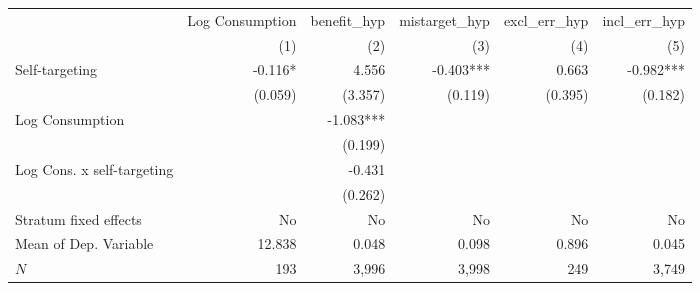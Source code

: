 \begin{tabular}{lrrrrr}
\toprule
                           & \multicolumn{1}{c}{Log Consumption} & \multicolumn{1}{c}{benefit_hyp} & \multicolumn{1}{c}{mistarget_hyp} & \multicolumn{1}{c}{excl_err_hyp} & \multicolumn{1}{c}{incl_err_hyp} \\ 
\cmidrule(lr){2-2} \cmidrule(lr){3-3} \cmidrule(lr){4-4} \cmidrule(lr){5-5} \cmidrule(lr){6-6} 
                           &                                 (1) &                             (2) &                               (3) &                              (4) &                              (5) \\ 
\midrule
Self-targeting             &                             -0.116* &                           4.556 &                         -0.403*** &                            0.663 &                        -0.982*** \\ 
                           &                             (0.059) &                         (3.357) &                           (0.119) &                          (0.395) &                          (0.182) \\ 
Log Consumption            &                                     &                       -1.083*** &                                   &                                  &                                  \\ 
                           &                                     &                         (0.199) &                                   &                                  &                                  \\ 
Log Cons. x self-targeting &                                     &                          -0.431 &                                   &                                  &                                  \\ 
                           &                                     &                         (0.262) &                                   &                                  &                                  \\ 
\midrule
Stratum fixed effects      &                                  No &                              No &                                No &                               No &                               No \\ 
Mean of Dep. Variable      &                              12.838 &                           0.048 &                             0.098 &                            0.896 &                            0.045 \\ 
$N$                        &                                 193 &                           3,996 &                             3,998 &                              249 &                            3,749 \\ 
\bottomrule
\end{tabular}
